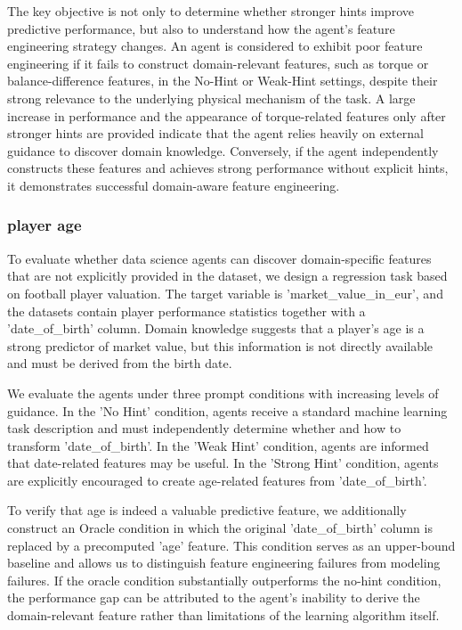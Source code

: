 The key objective is not only to determine whether stronger hints improve predictive performance, but also to understand how the agent's feature engineering strategy changes. An agent is considered to exhibit poor feature engineering if it fails to construct domain-relevant features, such as torque or balance-difference features, in the No-Hint or Weak-Hint settings, despite their strong relevance to the underlying physical mechanism of the task. A large increase in performance and the appearance of torque-related features only after stronger hints are provided indicate that the agent relies heavily on external guidance to discover domain knowledge. Conversely, if the agent independently constructs these features and achieves strong performance without explicit hints, it demonstrates successful domain-aware feature engineering.

\subsubsection{player age}
To evaluate whether data science agents can discover domain-specific features that are not explicitly provided in the dataset, we design a regression task based on football player valuation. The target variable is 'market\_value\_in\_eur', and the datasets contain player performance statistics together with a 'date\_of\_birth' column. Domain knowledge suggests that a player's age is a strong predictor of market value, but this information is not directly available and must be derived from the birth date.

We evaluate the agents under three prompt conditions with increasing levels of guidance. In the 'No Hint' condition, agents receive a standard machine learning task description and must independently determine whether and how to transform 'date\_of\_birth'. In the 'Weak Hint' condition, agents are informed that date-related features may be useful. In the 'Strong Hint' condition, agents are explicitly encouraged to create age-related features from 'date\_of\_birth'.

To verify that age is indeed a valuable predictive feature, we additionally construct an Oracle condition in which the original 'date\_of\_birth' column is replaced by a precomputed 'age' feature. This condition serves as an upper-bound baseline and allows us to distinguish feature engineering failures from modeling failures. If the oracle condition substantially outperforms the no-hint condition, the performance gap can be attributed to the agent's inability to derive the domain-relevant feature rather than limitations of the learning algorithm itself.

